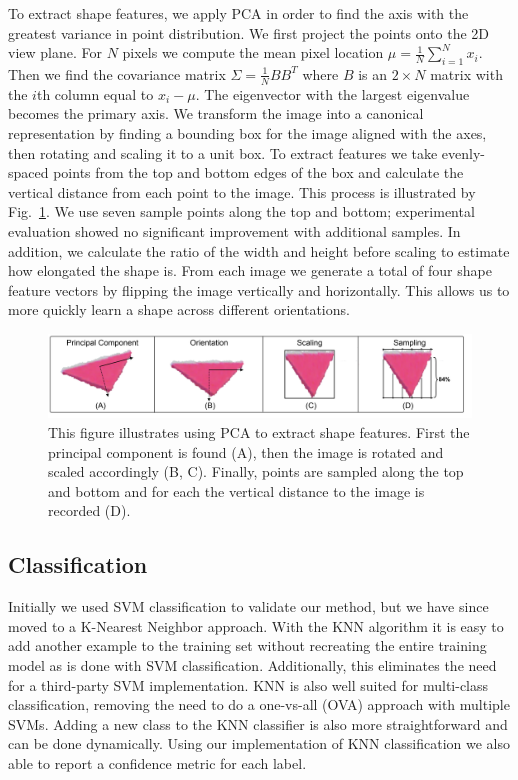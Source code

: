 \documentclass[11pt]{article}
\begin{document}
To extract shape features, we apply PCA in order to find the axis with the
greatest variance in point distribution. We first project the points onto the
2D view plane. For $N$ pixels we compute the mean pixel location $\mu =
\frac{1}{N}\displaystyle\sum_{i=1}^{N}x_i$. Then we find the covariance matrix
$\Sigma = \frac{1}{N} BB^T$ where $B$ is an $2\times N$ matrix with the $i$th
column equal to $x_i - \mu$. The eigenvector with the largest eigenvalue
becomes the primary axis. We transform the image into a canonical representation
by finding a bounding box for the image aligned with the axes, then rotating and
scaling it to a unit box. To extract features we take evenly-spaced
points from the top and bottom edges of the box and calculate the vertical distance
from each point to the image. This process is illustrated by Fig.~\ref{fig:pca}. We use seven
sample points along the top and bottom; experimental evaluation showed no significant
improvement with additional samples. In addition, we calculate the ratio of the width
and height before scaling to estimate how elongated the shape is. From
each image we generate a total of four shape feature vectors by flipping
the image vertically and horizontally. This allows us to more quickly learn a
shape across different orientations.

\begin{figure}[h!]
\centering
    \includegraphics[width=1.0\textwidth]{figures/PCA_example.png}
    \caption{This figure illustrates using PCA to extract shape features.
        First the principal component is found (A), then the image is rotated
        and scaled accordingly (B, C). Finally, points are sampled along
        the top and bottom and for each the vertical distance to the image
        is recorded (D).}
    \label{fig:pca}
\end{figure}

\subsection{Classification}
Initially we used SVM classification to validate our method, but we have since
moved to a K-Nearest Neighbor approach.  With the KNN algorithm
it is easy to add another example to the training set without recreating the
entire training model as is done with SVM classification. Additionally, this
eliminates the need for a third-party SVM implementation. KNN is also well
suited for multi-class classification, removing
the need to do a one-vs-all (OVA) approach with multiple SVMs. Adding a new
class to the KNN classifier is also more straightforward and can be done dynamically. Using our
implementation of KNN classification we also able to report a confidence metric for each label.
\end{document}
